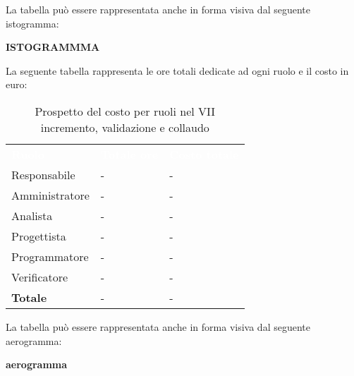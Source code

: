 La tabella può essere rappresentata anche in forma visiva dal seguente istogramma:

\textbf{ISTOGRAMMMA}


La seguente tabella rappresenta le ore totali dedicate ad ogni ruolo e il costo in euro:

\begin{table}[!htbp]
\begin{center}
\renewcommand{\arraystretch}{1.5}
\begin{tabular}{ m{}<{\centering}  m{}<{\centering} m{}<{\centering}}
	\rowcolor{darkblue}
	\textcolor{white}{\textbf{Ruolo}}&\textcolor{white}{\textbf{Totale ore}}&\textcolor{white}{\textbf{Costo totale}}\\ 

	Responsabile  & - & - \\	

	\rowcolor{gray!10} Amministratore & - & - \\
	
	Analista & - & - \\
	
	\rowcolor{gray!10} Progettista & - & - \\
	
	Programmatore & - & - \\
	
	\rowcolor{gray!10} Verificatore & - & - \\
	
	\textbf{Totale} & - & - \\
	
\end{tabular}
\caption{Prospetto del costo per ruoli nel VII incremento,  validazione e collaudo}
\end{center}
\end{table}

La tabella può essere rappresentata anche in forma visiva dal seguente aerogramma:

\textbf{aerogramma}


